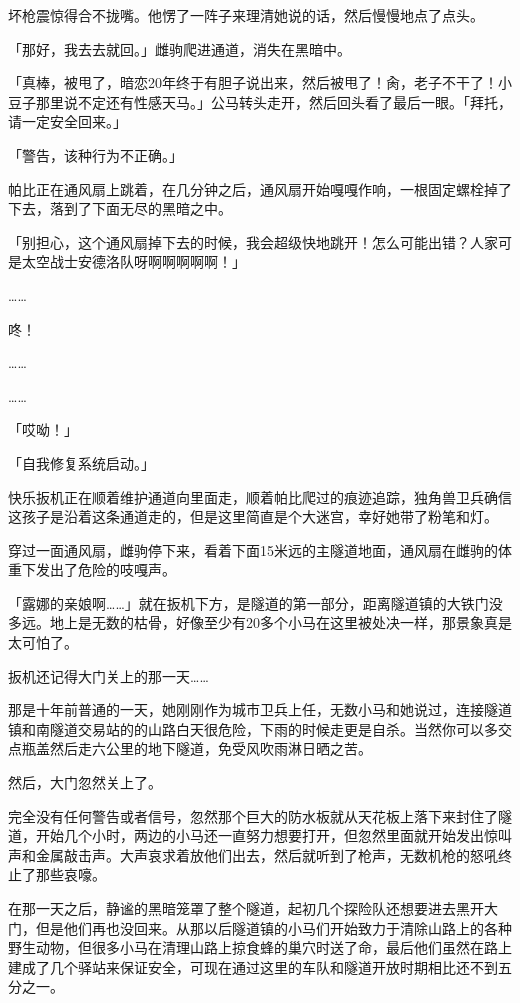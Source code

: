 坏枪震惊得合不拢嘴。他愣了一阵子来理清她说的话，然后慢慢地点了点头。

「那好，我去去就回。」雌驹爬进通道，消失在黑暗中。

「真棒，被甩了，暗恋20年终于有胆子说出来，然后被甩了！肏，老子不干了！小豆子那里说不定还有性感天马。」公马转头走开，然后回头看了最后一眼。「拜托，请一定安全回来。」

\horizonline


「{\mtzh 警告，该种行为不正确。}」

帕比正在通风扇上跳着，在几分钟之后，通风扇开始嘎嘎作响，一根固定螺栓掉了下去，落到了下面无尽的黑暗之中。

「别担心，这个通风扇掉下去的时候，我会超级快地跳开！怎么可能出错？人家可是太空战士安德洛队呀啊啊啊啊啊！」

……

咚！

……

……

「哎呦！」

「{\mtzh 自我修复系统启动。}」

\horizonline


快乐扳机正在顺着维护通道向里面走，顺着帕比爬过的痕迹追踪，独角兽卫兵确信这孩子是沿着这条通道走的，但是这里简直是个大迷宫，幸好她带了粉笔和灯。

穿过一面通风扇，雌驹停下来，看着下面15米远的主隧道地面，通风扇在雌驹的体重下发出了危险的吱嘎声。

「露娜的亲娘啊……」就在扳机下方，是隧道的第一部分，距离隧道镇的大铁门没多远。地上是无数的枯骨，好像至少有20多个小马在这里被处决一样，那景象真是太可怕了。

扳机还记得大门关上的那一天……

那是十年前普通的一天，她刚刚作为城市卫兵上任，无数小马和她说过，连接隧道镇和南隧道交易站的的山路白天很危险，下雨的时候走更是自杀。当然你可以多交点瓶盖然后走六公里的地下隧道，免受风吹雨淋日晒之苦。

然后，大门忽然关上了。

完全没有任何警告或者信号，忽然那个巨大的防水板就从天花板上落下来封住了隧道，开始几个小时，两边的小马还一直努力想要打开，但忽然里面就开始发出惊叫声和金属敲击声。大声哀求着放他们出去，然后就听到了枪声，无数机枪的怒吼终止了那些哀嚎。

在那一天之后，静谧的黑暗笼罩了整个隧道，起初几个探险队还想要进去黑开大门，但是他们再也没回来。从那以后隧道镇的小马们开始致力于清除山路上的各种野生动物，但很多小马在清理山路上掠食蜂的巢穴时送了命，最后他们虽然在路上建成了几个驿站来保证安全，可现在通过这里的车队和隧道开放时期相比还不到五分之一。

